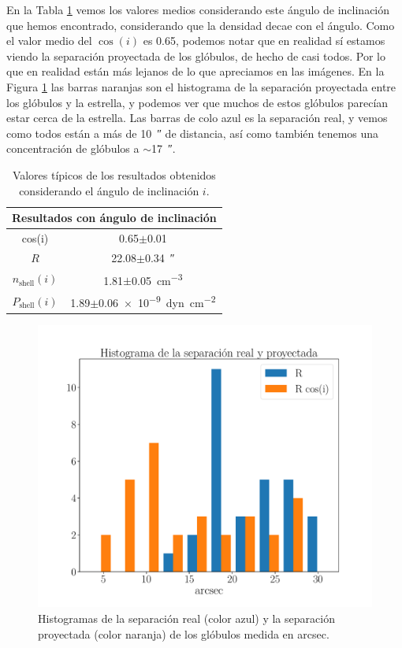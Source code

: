 \documentclass{book}
\begin{document}
En la Tabla \ref{tab:mean_i} vemos los valores medios considerando este ángulo de inclinación que hemos encontrado, considerando que la densidad decae con el ángulo. Como el valor medio del $\cos(i)$ es 0.65, podemos notar que en realidad sí estamos viendo la separación proyectada de los glóbulos, de hecho de casi todos. Por lo que en realidad están más lejanos de lo que apreciamos en las imágenes. En la Figura \ref{fig:hist_sep_ryp} las barras naranjas son el histograma de la separación proyectada entre los glóbulos y la estrella, y podemos ver que muchos de estos glóbulos parecían estar cerca de la estrella. Las barras de colo azul es la separación real, y vemos como todos están a más de \SI{10}{\arcsecond} de distancia, así como también tenemos una concentración de glóbulos a $\sim$\SI{17}{\arcsecond}.

\begin{table}[htb]
    \centering
    \begin{tabular}{c c}
        \toprule
        \multicolumn{2}{c}{Resultados con ángulo de inclinación} \\ \midrule
         cos(i) & 0.65$\pm$0.01 \\
         $R$ & 22.08$\pm$\SI{0.34}{\arcsecond}\\
         $n_\mathrm{shell}(i)$ & 1.81$\pm$\SI{0.05}{cm^{-3}}\\
         $P_\mathrm{shell}(i)$ & 1.89$\pm$\SI{0.06e-9}{dyn.cm^{-2}} \\
         \bottomrule
    \end{tabular}
    \caption{Valores típicos de los resultados obtenidos considerando el ángulo de inclinación $i$.}
    \label{tab:mean_i}
\end{table}

\begin{figure}[htb]
    \centering
    \includegraphics[width=\textwidth]{ultimos/Hist_seprarcion(1).pdf}
    \caption{Histogramas de la separación real (color azul) y la separación proyectada (color naranja) de los glóbulos medida en arcsec.}
    \label{fig:hist_sep_ryp}
\end{figure}
\end{document}
